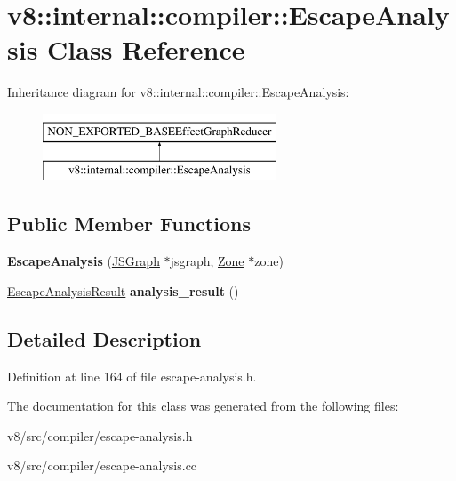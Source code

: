 \hypertarget{classv8_1_1internal_1_1compiler_1_1EscapeAnalysis}{}\section{v8\+:\+:internal\+:\+:compiler\+:\+:Escape\+Analysis Class Reference}
\label{classv8_1_1internal_1_1compiler_1_1EscapeAnalysis}
Inheritance diagram for v8\+:\+:internal\+:\+:compiler\+:\+:Escape\+Analysis\+:\begin{figure}[H]
\begin{center}
\leavevmode
\includegraphics[height=2.000000cm]{classv8_1_1internal_1_1compiler_1_1EscapeAnalysis}
\end{center}
\end{figure}
\subsection*{Public Member Functions}
\begin{DoxyCompactItemize}
\item 
\mbox{\label{classv8_1_1internal_1_1compiler_1_1EscapeAnalysis_ad3c02fed17e015c097db035e19523c77}} 
{\bfseries Escape\+Analysis} (\mbox{\hyperlink{classv8_1_1internal_1_1compiler_1_1JSGraph}{J\+S\+Graph}} $\ast$jsgraph, \mbox{\hyperlink{classv8_1_1internal_1_1Zone}{Zone}} $\ast$zone)
\item 
\mbox{\label{classv8_1_1internal_1_1compiler_1_1EscapeAnalysis_a74ca1e4ede6b48ef2ff7fcd2a1d9c8bf}} 
\mbox{\hyperlink{classv8_1_1internal_1_1compiler_1_1EscapeAnalysisResult}{Escape\+Analysis\+Result}} {\bfseries analysis\+\_\+result} ()
\end{DoxyCompactItemize}


\subsection{Detailed Description}


Definition at line 164 of file escape-\/analysis.\+h.



The documentation for this class was generated from the following files\+:\begin{DoxyCompactItemize}
\item 
v8/src/compiler/escape-\/analysis.\+h\item 
v8/src/compiler/escape-\/analysis.\+cc\end{DoxyCompactItemize}
